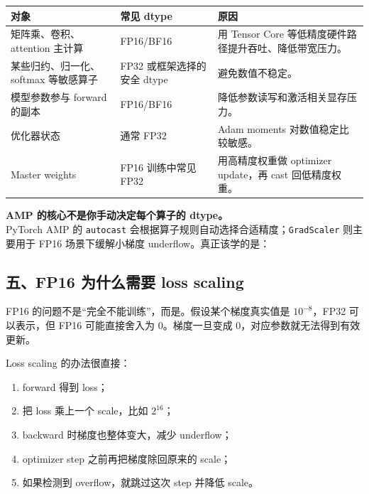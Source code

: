 \begin{center}
{\small
\begin{tabular}{p{3.5cm}p{4cm}p{4.8cm}}
\hline
\textbf{对象} & \textbf{常见 dtype} & \textbf{原因} \\
\hline
矩阵乘、卷积、attention 主计算 & FP16/BF16 & 用 Tensor Core 等低精度硬件路径提升吞吐、降低带宽压力。 \\
某些归约、归一化、softmax 等敏感算子 & FP32 或框架选择的安全 dtype & 避免数值不稳定。 \\
模型参数参与 forward 的副本 & FP16/BF16 & 降低参数读写和激活相关显存压力。 \\
优化器状态 & 通常 FP32 & Adam moments 对数值稳定比较敏感。 \\
Master weights & FP16 训练中常见 FP32 & 用高精度权重做 optimizer update，再 cast 回低精度权重。 \\
\hline
\end{tabular}
}
\end{center}

\begin{summarybox}
\textbf{AMP 的核心不是你手动决定每个算子的 dtype。}\\
PyTorch AMP 的 \texttt{autocast} 会根据算子规则自动选择合适精度；\texttt{GradScaler} 则主要用于 FP16 场景下缓解小梯度 underflow。真正该学的是：
\end{summarybox}

\subsection{五、FP16 为什么需要 loss scaling}

FP16 的问题不是“完全不能训练”，而是。假设某个梯度真实值是 $10^{-8}$，FP32 可以表示，但 FP16 可能直接舍入为 0。梯度一旦变成 0，对应参数就无法得到有效更新。

Loss scaling 的办法很直接：

\begin{enumerate}[leftmargin=1.5em]
  \item forward 得到 loss；
  \item 把 loss 乘上一个 scale，比如 $2^{16}$；
  \item backward 时梯度也整体变大，减少 underflow；
  \item optimizer step 之前再把梯度除回原来的 scale；
  \item 如果检测到 overflow，就跳过这次 step 并降低 scale。
\end{enumerate}


